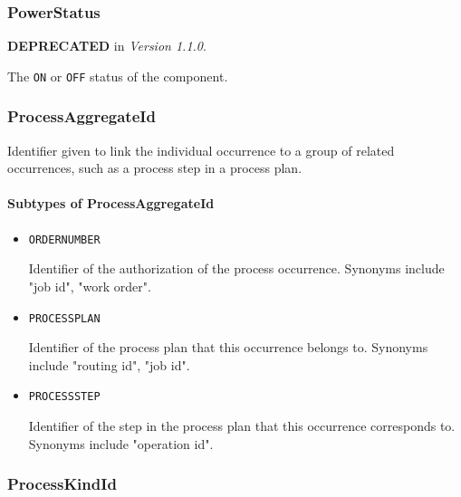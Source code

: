 \subsubsection{PowerStatus}
\label{sec:PowerStatus}



\textbf{DEPRECATED} in \textit{Version 1.1.0}.

The \texttt{ON} or \texttt{OFF} status of the component.



\subsubsection{ProcessAggregateId}
\label{sec:ProcessAggregateId}



Identifier given to link the individual occurrence to a group of related occurrences, such as a process step in a process plan.


\paragraph{Subtypes of ProcessAggregateId}\mbox{}
\label{sec:Subtypes of ProcessAggregateId}

\begin{itemize}

\item \texttt{ORDER\textunderscore NUMBER}


Identifier of the authorization of the process occurrence. Synonyms include "job id", "work order".

\item \texttt{PROCESS\textunderscore PLAN}


Identifier of the process plan that this occurrence belongs to. Synonyms include "routing id", "job id".


\item \texttt{PROCESS\textunderscore STEP}


Identifier of the step in the process plan that this occurrence corresponds to. Synonyms include "operation id".


\end{itemize}






\subsubsection{ProcessKindId}
\label{sec:ProcessKindId}



